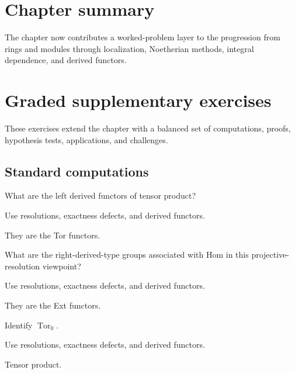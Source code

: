 \section*{Chapter summary}
The chapter now contributes a worked-problem layer to the progression from rings and modules through localization, Noetherian methods, integral dependence, and derived functors.
\section{Graded supplementary exercises}
These exercises extend the chapter with a balanced set of computations, proofs, hypothesis tests, applications, and challenges.

\subsection*{Standard computations}

\begin{exercise}\label{exr:v28-expand-01}
What are the left derived functors of tensor product?
\end{exercise}
\begin{hint}
Use resolutions, exactness defects, and derived functors.
\end{hint}
\begin{solution}
They are the Tor functors.
\end{solution}

\begin{exercise}\label{exr:v28-expand-02}
What are the right-derived-type groups associated with Hom in this projective-resolution viewpoint?
\end{exercise}
\begin{hint}
Use resolutions, exactness defects, and derived functors.
\end{hint}
\begin{solution}
They are the Ext functors.
\end{solution}

\begin{exercise}\label{exr:v28-expand-03}
Identify $\operatorname{Tor}_0$.
\end{exercise}
\begin{hint}
Use resolutions, exactness defects, and derived functors.
\end{hint}
\begin{solution}
Tensor product.
\end{solution}

